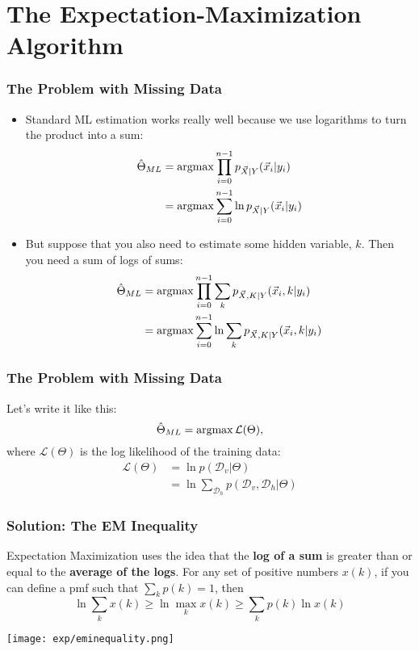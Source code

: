 \documentclass{beamer}
\newcommand{\argmax}{\operatornamewithlimits{argmax}}
\begin{document}
\section[EM]{The Expectation-Maximization Algorithm}
\setcounter{subsection}{1}

\begin{frame}
  \frametitle{The Problem with Missing Data}

  \begin{itemize}
  \item Standard ML estimation works really well because we use
    logarithms to turn the product  into a sum:
    \begin{align*}
      \hat{\Theta}_{ML} &= \argmax \prod_{i=0}^{n-1}p_{\vec{X}|Y}(\vec{x}_i|y_i)\\
      &= \argmax \sum_{i=0}^{n-1}\ln p_{\vec{X}|Y}(\vec{x}_i|y_i)
    \end{align*}
  \item But suppose that you also need to estimate some hidden variable, $k$.
    Then you need a sum of logs of sums:
    \begin{align*}
      \hat{\Theta}_{ML} &= \argmax \prod_{i=0}^{n-1}\sum_{k} p_{\vec{X},K|Y}(\vec{x}_i,k|y_i)\\
      &= \argmax \sum_{i=0}^{n-1}\ln\sum_k p_{\vec{X},K|Y}(\vec{x}_i,k|y_i)
    \end{align*}
  \end{itemize}
\end{frame}

\begin{frame}
  \frametitle{The Problem with Missing Data}

  Let's write it like this:
  \begin{displaymath}
    \hat\Theta_{ML} = \argmax {\mathcal L}(\Theta),
  \end{displaymath}
  where ${\mathcal L}(\Theta)$ is the log likelihood of the training
  data:
  \begin{align*}
    {\mathcal L}(\Theta)
    &= \ln p\left({\mathcal D}_v|\Theta\right)\\
    &= \ln\sum_{{\mathcal D}_h}p\left({\mathcal D}_v,{\mathcal D}_h|\Theta\right)
  \end{align*}
\end{frame}

\begin{frame}
  \frametitle{Solution: The EM Inequality}

  Expectation Maximization uses the idea that the {\bf log of a sum}
  is greater than or equal to the {\bf average of the logs}.  For any
  set of positive numbers $x(k)$, if you can define a pmf such that
  $\sum_k p(k)=1$, then
  \begin{displaymath}
    \ln\sum_k x(k) \ge \ln\max_k x(k)  \ge \sum_k p(k)\ln x(k)
  \end{displaymath}
  \centerline{\texttt{[image: exp/eminequality.png]}}
\end{frame}
\end{document}
